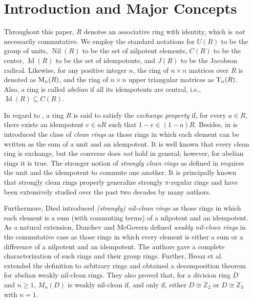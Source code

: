 \documentclass[12pt]{amsart}
\begin{document}
\section{Introduction and Major Concepts}

Throughout this paper, \( R \) denotes an associative ring with identity, which is {\it not} necessarily commutative. We employ the standard notations for \( U(R) \) to be the group of units, \(\operatorname{Nil}(R) \) to be the set of nilpotent elements, \( C(R) \) to be the center, \( \operatorname{Id}(R) \) to be the set of idempotents, and \( J(R) \) to be the Jacobson radical. Likewise, for any positive integer \( n \), the ring of \( n \times n \) matrices over \( R \) is denoted as \( {\rm M}_{n}(R) \), and the ring of \( n \times n \) upper triangular matrices as \( {\rm T}_{n}(R) \). Also, a ring is called \textit{abelian} if all its idempotents are central, i.e., \( \operatorname{Id}(R) \subseteq C(R) \).

In regard to \cite{8}, a ring \( R \) is said to satisfy the \textit{exchange property} if, for every \( a \in R \), there exists an idempotent \( e \in aR \) such that \( 1-e \in (1-a)R \). Besides, in \cite{8} is introduced the class of \textit{clean rings} as those rings in which each element can be written as the sum of a unit and an idempotent. It is well known that every clean ring is exchange, but the converse does {\it not} hold in general; however, for abelian rings it is true. The stronger notion of \textit{strongly clean rings} as defined in \cite{Nic2} requires the unit and the idempotent to commute one another. It is principally known that strongly clean rings properly generalize strongly \(\pi\)-regular rings and have been extensively studied over the past two decades by many authors.

Furthermore, Diesl \cite{diesl} introduced {\it (strongly) nil-clean rings} as those rings in which each element is a sum (with commuting terms) of a nilpotent and an idempotent. As a natural extension, Danchev and McGovern \cite{DMc} defined \textit{weakly nil-clean rings} in the commutative case as those rings in which every element is either a sum or a difference of a nilpotent and an idempotent. The authors gave a complete characterization of such rings and their group rings. Further, Breaz et al. \cite{BDZ} extended the definition to arbitrary rings and obtained a decomposition theorem for abelian weakly nil-clean rings. They also proved that, for a division ring \( D \) and \( n \ge 1 \), \( M_{n}(D) \) is weakly nil-clean if, and only if, either \( D \cong \mathbb{Z}_2 \) or \( D \cong \mathbb{Z}_3 \) with \( n=1 \).
\end{document}
